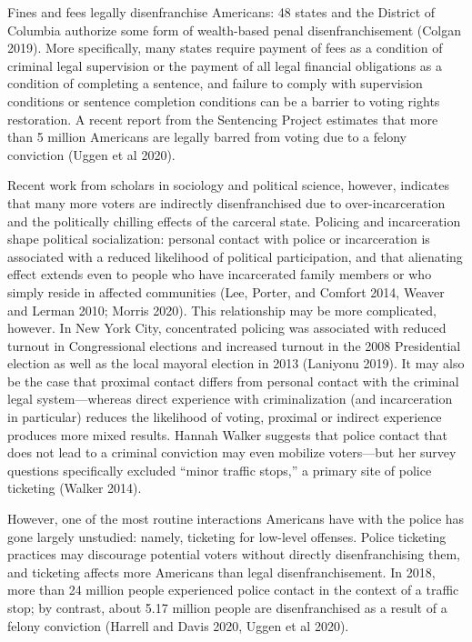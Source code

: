 \documentclass[
  12pt,
]{article}
\begin{document}
Fines and fees legally disenfranchise Americans: 48 states and the District of Columbia authorize some form of wealth-based penal disenfranchisement (Colgan 2019). More specifically, many states require payment of fees as a condition of criminal legal supervision or the payment of all legal financial obligations as a condition of completing a sentence, and failure to comply with supervision conditions or sentence completion conditions can be a barrier to voting rights restoration. A recent report from the Sentencing Project estimates that more than 5 million Americans are legally barred from voting due to a felony conviction (Uggen et al 2020).

Recent work from scholars in sociology and political science, however, indicates that many more voters are indirectly disenfranchised due to over-incarceration and the politically chilling effects of the carceral state. Policing and incarceration shape political socialization: personal contact with police or incarceration is associated with a reduced likelihood of political participation, and that alienating effect extends even to people who have incarcerated family members or who simply reside in affected communities (Lee, Porter, and Comfort 2014, Weaver and Lerman 2010; Morris 2020). This relationship may be more complicated, however. In New York City, concentrated policing was associated with reduced turnout in Congressional elections and increased turnout in the 2008 Presidential election as well as the local mayoral election in 2013 (Laniyonu 2019). It may also be the case that proximal contact differs from personal contact with the criminal legal system---whereas direct experience with criminalization (and incarceration in particular) reduces the likelihood of voting, proximal or indirect experience produces more mixed results. Hannah Walker suggests that police contact that does not lead to a criminal conviction may even mobilize voters---but her survey questions specifically excluded ``minor traffic stops,'' a primary site of police ticketing (Walker 2014).

However, one of the most routine interactions Americans have with the police has gone largely unstudied: namely, ticketing for low-level offenses. Police ticketing practices may discourage potential voters without directly disenfranchising them, and ticketing affects more Americans than legal disenfranchisement. In 2018, more than 24 million people experienced police contact in the context of a traffic stop; by contrast, about 5.17 million people are disenfranchised as a result of a felony conviction (Harrell and Davis 2020, Uggen et al 2020).
\end{document}
